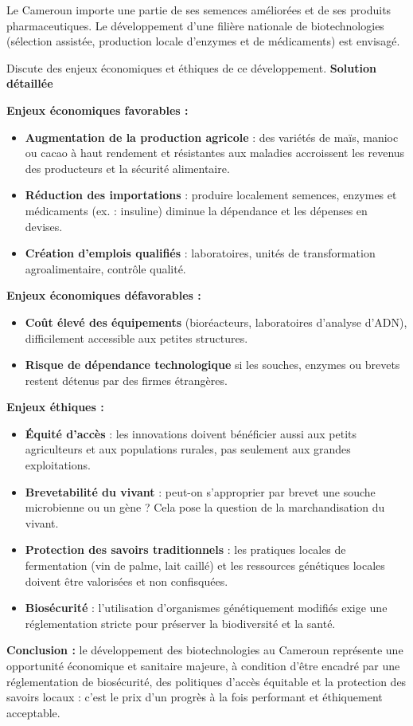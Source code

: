 \documentclass[11pt]{article}
\begin{document}
\begin{exoresolu}
Le Cameroun importe une partie de ses semences améliorées et de ses produits pharmaceutiques. Le développement d'une filière nationale de biotechnologies (sélection assistée, production locale d'enzymes et de médicaments) est envisagé.

Discute des enjeux économiques et éthiques de ce développement.
\tcblower
\textbf{Solution détaillée}

\textbf{Enjeux économiques favorables :}
\begin{itemize}
\item \textbf{Augmentation de la production agricole} : des variétés de maïs, manioc ou cacao à haut rendement et résistantes aux maladies accroissent les revenus des producteurs et la sécurité alimentaire.
\item \textbf{Réduction des importations} : produire localement semences, enzymes et médicaments (ex. : insuline) diminue la dépendance et les dépenses en devises.
\item \textbf{Création d'emplois qualifiés} : laboratoires, unités de transformation agroalimentaire, contrôle qualité.
\end{itemize}

\textbf{Enjeux économiques défavorables :}
\begin{itemize}
\item \textbf{Coût élevé des équipements} (bioréacteurs, laboratoires d'analyse d'ADN), difficilement accessible aux petites structures.
\item \textbf{Risque de dépendance technologique} si les souches, enzymes ou brevets restent détenus par des firmes étrangères.
\end{itemize}

\textbf{Enjeux éthiques :}
\begin{itemize}
\item \textbf{Équité d'accès} : les innovations doivent bénéficier aussi aux petits agriculteurs et aux populations rurales, pas seulement aux grandes exploitations.
\item \textbf{Brevetabilité du vivant} : peut-on s'approprier par brevet une souche microbienne ou un gène ? Cela pose la question de la marchandisation du vivant.
\item \textbf{Protection des savoirs traditionnels} : les pratiques locales de fermentation (vin de palme, lait caillé) et les ressources génétiques locales doivent être valorisées et non confisquées.
\item \textbf{Biosécurité} : l'utilisation d'organismes génétiquement modifiés exige une réglementation stricte pour préserver la biodiversité et la santé.
\end{itemize}

\textbf{Conclusion :} le développement des biotechnologies au Cameroun représente une opportunité économique et sanitaire majeure, à condition d'être encadré par une réglementation de biosécurité, des politiques d'accès équitable et la protection des savoirs locaux : c'est le prix d'un progrès à la fois performant et éthiquement acceptable.
\end{exoresolu}
\end{document}

